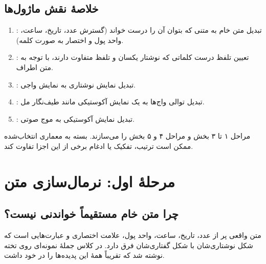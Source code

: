 
\subsection{خلاصهٔ نقش ماژول‌ها}
\begin{enumerate}
  \item {}: تبدیل متن خام به متنی که بتوان آن را درست خواند (گسترش عدد، تاریخ، ساعت، واحد پول و اختصار به صورت کلمه).
  \item {}: تعیین تلفظ درست کلماتی که نوشتار یکسان و تلفظ متفاوت دارند، با توجه به متن اطراف.
  \item {}: تبدیل نمایش نوشتاری به نمایش واجی.
  \item {}: تبدیل توالی واج‌ها به یک نمایش آکوستیکی مانند طیف‌نگار مل.
  \item {}: تبدیل نمایش آکوستیکی به موج صوتی.
\end{enumerate}
مراحل ۱ تا ۳ بخش  و مراحل ۴ و ۵ بخش  را می‌سازند. بسته به معماری انتخاب‌شده ممکن است ترتیب، تفکیک یا ادغام برخی از این اجزا تفاوت کند.

\section{مرحلهٔ اول: نرمال‌سازی متن}

\subsection{چرا متن خام مستقیماً خواندنی نیست؟}
متن واقعی پر از عدد، تاریخ، ساعت، واحد پول، علامت اختصاری و عبارت‌هایی است که شکل نوشتاری‌شان با شکل گفتاری‌شان فرق دارد. در کلاس جملهٔ نمونه‌ای روی تخته نوشته شد که تقریباً همهٔ این پدیده‌ها را در خود داشت.

